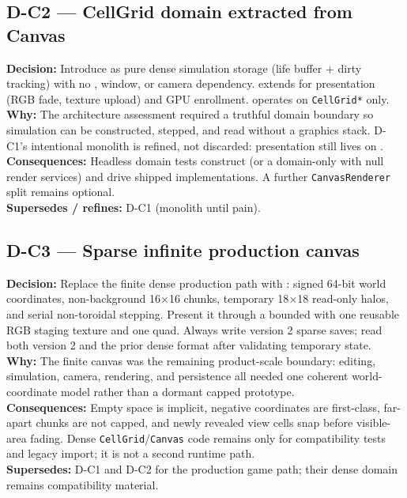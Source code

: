\subsection*{D-C2 --- CellGrid domain extracted from Canvas}
\begin{decisionbox}[title={D-C2 \quad 2026-08-06}]
\textbf{Decision:} Introduce  as pure dense simulation
storage (life buffer + dirty tracking) with no , window, or
camera dependency.  extends  for
presentation (RGB fade, texture upload) and GPU enrollment.
 operates on \texttt{CellGrid*} only.\\
\textbf{Why:} The architecture assessment required a truthful domain boundary so
simulation can be constructed, stepped, and read without a graphics stack.
D-C1's intentional monolith is refined, not discarded: presentation still lives
on .\\
\textbf{Consequences:} Headless domain tests construct 
(or a domain-only  with null render services) and drive
shipped  implementations. A further
\texttt{CanvasRenderer} split remains optional.\\
\textbf{Supersedes / refines:} D-C1 (monolith until pain).
\end{decisionbox}

\subsection*{D-C3 --- Sparse infinite production canvas}
\begin{decisionbox}[title={D-C3 \quad 2026-08-07}]
\textbf{Decision:} Replace the finite dense production path with
: signed 64-bit world coordinates, non-background
16$\times$16 chunks, temporary 18$\times$18 read-only halos, and serial
non-toroidal stepping. Present it through a bounded 
with one reusable RGB staging texture and one quad. Always write
version 2 sparse saves; read both version 2 and the prior dense format after
validating temporary state.\\
\textbf{Why:} The finite canvas was the remaining product-scale boundary:
editing, simulation, camera, rendering, and persistence all needed one
coherent world-coordinate model rather than a dormant capped prototype.\\
\textbf{Consequences:} Empty space is implicit, negative coordinates are
first-class, far-apart chunks are not capped, and newly revealed view cells
snap before visible-area fading. Dense \texttt{CellGrid}/\texttt{Canvas} code
remains only for compatibility tests and legacy import; it is not a second
runtime path.\\
\textbf{Supersedes:} D-C1 and D-C2 for the production game path; their dense
domain remains compatibility material.
\end{decisionbox}

